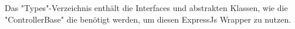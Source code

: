 
Das "Types"-Verzeichnis enthält die Interfaces und abstrakten Klassen, wie die "ControllerBase" die benötigt werden, um diesen ExpressJs Wrapper zu nutzen.
